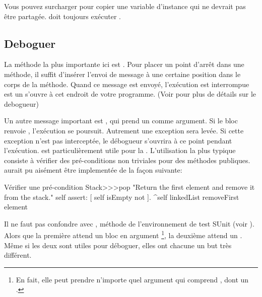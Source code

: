 \documentclass[a4paper,10pt,twoside]{book}
\begin{document}
Vous pouvez surcharger  pour copier une variable d'instance qui ne devrait pas \^etre partag\'ee.  doit toujours ex\'ecuter .


\subsection{Deboguer}

La m\'ethode la plus importante ici est . Pour placer un point d'arr\^et dans une m\'ethode, il suffit d'ins\'erer l'envoi de message  \`a une certaine position dans le corps de la m\'ethode.  Quand ce message est envoy\'e, l'ex\'ecution est interrompue est un  s'ouvre \`a cet endroit de votre programme.
(Voir  pour plus de d\'etails sur le debogueur)


Un autre message important est , qui prend un  comme argument. Si le bloc renvoie , l'ex\'ecution se poursuit. Autrement une exception sera lev\'ee. Si  cette exception n'est pas intercept\'ee, le d\'ebogueur s'ouvrira \`a ce point pendant l'ex\'ecution.  est particuli\`erement utile pour la . L'utilisation la plus typique consiste \`a v\'erifier des pr\'e-conditions non triviales pour des m\'ethodes publiques.  aurait pu ais\'ement \^etre implement\'ee de la fa\c{c}on suivante:

\begin{method}{V\'erifier une pr\'e-condition}
Stack>>>pop
    "Return the first element and remove it from the stack."
    self assert: [ self isEmpty not ].
    ^self linkedList removeFirst element
\end{method}

Il ne faut pas confondre  avec , m\'ethode de l'environnement de test SUnit (voir ). Alors que la premi\`ere attend un bloc en argument \footnote{En fait, elle peut prendre n'importe quel argument qui comprend , dont un .}, la deuxi\`eme attend un . M\^eme si les deux sont utiles pour d\'eboguer, elles ont chacune un but tr\`es diff\'erent.
\end{document}
